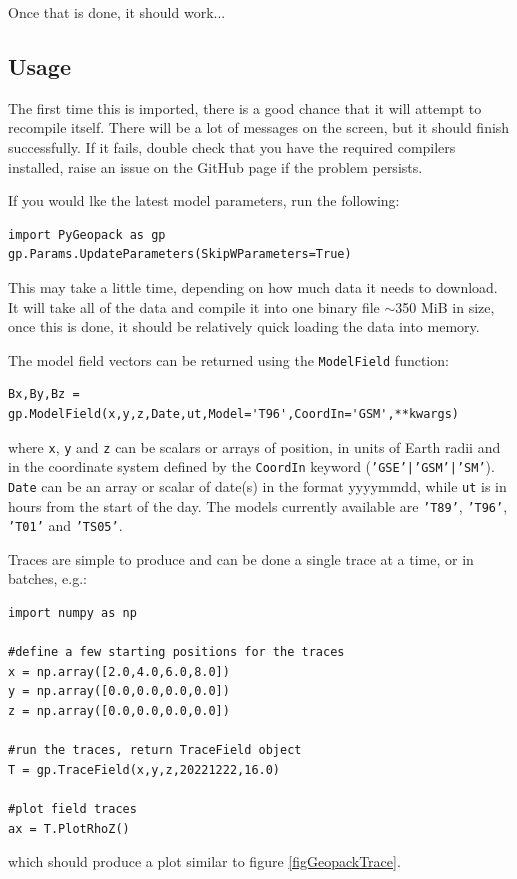 			Once that is done, it should work...
		
		\subsection{Usage}

			The first time this is imported, there is a good chance that it will attempt to recompile itself. There will be a lot of messages on the screen, but it should finish successfully. If it fails, double check that you have the required compilers installed, raise an issue on the GitHub page if the problem persists.

			If you would lke the latest model parameters, run the following:
			\begin{verbatim}
import PyGeopack as gp
gp.Params.UpdateParameters(SkipWParameters=True)
			\end{verbatim}
			This may take a little time, depending on how much data it needs to download. It will take all of the data and compile it into one binary file $\sim$350 MiB in size, once this is done, it should be relatively quick loading the data into memory.

			The model field vectors can be returned using the \texttt{ModelField} function:
			\begin{verbatim}
Bx,By,Bz = gp.ModelField(x,y,z,Date,ut,Model='T96',CoordIn='GSM',**kwargs)
			\end{verbatim}
			where \texttt{x}, \texttt{y} and \texttt{z} can be scalars or arrays of position, in units of Earth radii and in the coordinate system defined by the \texttt{CoordIn} keyword (\texttt{'GSE'|'GSM'|'SM'}). \texttt{Date} can be an array or scalar of date(s) in the format yyyymmdd, while \texttt{ut} is in hours from the start of the day. The models currently available are \texttt{'T89'}, \texttt{'T96'}, \texttt{'T01'} and  \texttt{'TS05'}.

			Traces are simple to produce and can be done a single trace at a time, or in batches, e.g.:
			\begin{verbatim}
import numpy as np

#define a few starting positions for the traces
x = np.array([2.0,4.0,6.0,8.0])
y = np.array([0.0,0.0,0.0,0.0])
z = np.array([0.0,0.0,0.0,0.0])

#run the traces, return TraceField object
T = gp.TraceField(x,y,z,20221222,16.0)

#plot field traces
ax = T.PlotRhoZ()
			\end{verbatim}
			which should produce a plot similar to figure \ref{figGeopackTrace}.

